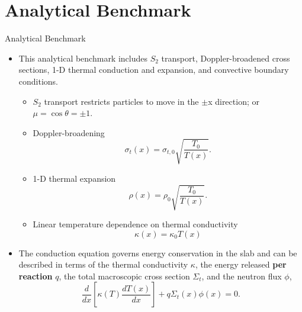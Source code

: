 \documentclass[9pt,t]{beamer}
\begin{document}
\section{Analytical Benchmark}
\begin{frame}{Analytical Benchmark}
    \begin{itemize}
        \item This analytical benchmark includes $S_2$ transport, Doppler-broadened cross sections, 1-D thermal conduction
        and expansion, and convective boundary conditions.
        \begin{itemize}
            \item $S_{2}$ transport restricts particles to move in the $\pm$x direction; or $\mu=\cos\theta=\pm 1$.
            \item Doppler-broadening
            \begin{equation}\label{doppler-micro-xs}
                \sigma_{t}(x) = \sigma_{t,0}\sqrt{\frac{T_{0}}{T(x)}}.
            \end{equation}
            \item 1-D thermal expansion
            \begin{equation} \label{density-temp-relation}
                \rho(x) =  \rho_{0} \sqrt{\frac{T_{0}}{T(x)}}.
            \end{equation}
            \item Linear temperature dependence on thermal conductivity
            \begin{equation}\label{thermal-conductivity-temp-relation}
                \kappa(x) = \kappa_{0} T(x)
            \end{equation}
        \end{itemize}
        \item The conduction equation governs energy conservation in the slab and can be described in terms of the thermal conductivity
        $\kappa$, the energy released \textbf{per reaction} $q$, the total macroscopic cross section $\Sigma_{t}$, and the neutron flux $\phi$,
        \begin{equation}
            \frac{d}{dx}\left\lbrack\kappa(T)\frac{dT(x)}{dx}\right\rbrack + q \Sigma_{t}(x)\phi(x) = 0.
        \end{equation}
    \end{itemize}
\end{frame}
\end{document}
